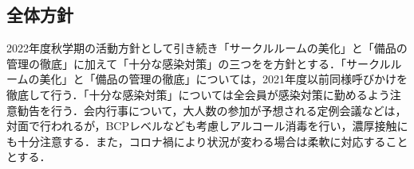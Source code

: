 \subsection*{全体方針}


2022年度秋学期の活動方針として引き続き「サークルルームの美化」と「備品の管理の徹底」に加えて「十分な感染対策」の三つをを方針とする．「サークルルームの美化」と「備品の管理の徹底」については，2021年度以前同様呼びかけを徹底して行う．「十分な感染対策」については全会員が感染対策に勤めるよう注意勧告を行う．会内行事について，大人数の参加が予想される定例会議などは，対面で行われるが，BCPレベルなども考慮しアルコール消毒を行い，濃厚接触にも十分注意する．また，コロナ禍により状況が変わる場合は柔軟に対応することとする．
